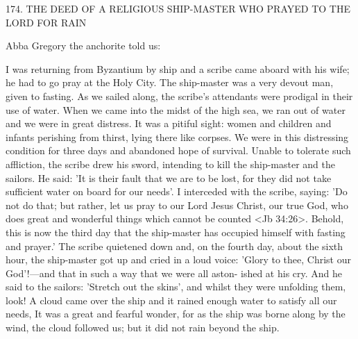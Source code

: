 174. THE DEED OF A RELIGIOUS SHIP-MASTER
WHO PRAYED TO THE LORD FOR RAIN

Abba Gregory the anchorite told us:

I was returning from Byzantium by ship and a scribe came aboard
with his wife; he had to go pray at the Holy City. The ship-master
was a very devout man, given to fasting. As we sailed along, the
scribe's attendants were prodigal in their use of water. When we
came into the midst of the high sea, we ran out of water and we
were in great distress. It was a pitiful sight: women and children and
infants perishing from thirst, lying there like corpses. We were in
this distressing condition for three days and abandoned hope of
survival. Unable to tolerate such affliction, the scribe drew his
sword, intending to kill the ship-master and the sailors. He said: 'It
is their fault that we are to be lost, for they did not take sufficient
water on board for our needs'. I interceded with the scribe, saying:
'Do not do that; but rather, let us pray to our Lord Jesus Christ,
our true God, who does great and wonderful things which cannot
be counted <Jb 34:26>. Behold, this is now the third day that the
ship-master has occupied himself with fasting and prayer.' The
scribe quietened down and, on the fourth day, about the sixth hour,
the ship-master got up and cried in a loud voice: 'Glory to thee,
Christ our God'!—and that in such a way that we were all aston-
ished at his cry. And he said to the sailors: 'Stretch out the skins',
and whilst they were unfolding them, look! A cloud came over the
ship and it rained enough water to satisfy all our needs, It was a
great and fearful wonder, for as the ship was borne along by the
wind, the cloud followed us; but it did not rain beyond the ship.

